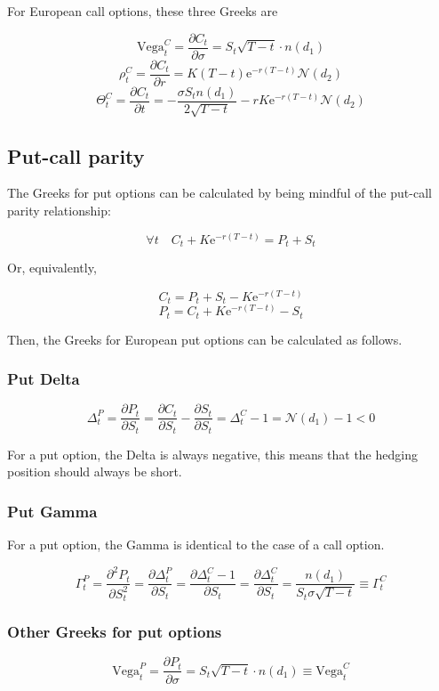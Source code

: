 \documentclass[oneside,titlepage,headinclude,12pt,a4paper,BCOR5mm,footinclude]{book}
\theoremstyle{defn}
\newcommand{\eexp}{\mathrm{e}}
\newcommand\NN{\mathcal{N}}
\newcommand\de\partial
\begin{document}
For European call options, these three Greeks are

\[
  \text{Vega}^C_t = \frac{\de C_t}{\de\sigma} = S_t\sqrt{T-t} \cdot n(d_1)
\]
\[
  \rho^C_t = \frac{\de C_t}{\de r} = K(T-t)\eexp^{-r(T-t)}\NN(d_2)
\]
\[
  \Theta^C_t = \frac{\de C_t}{\de t} = -\frac{\sigma S_t n(d_1)}{2\sqrt{T-t}} - rK\eexp^{-r(T-t)}\NN(d_2)
\]

\subsection{Put-call parity}

The Greeks for  put options can be  calculated by being mindful  of the put-call
parity relationship:

\[
  \forall t \quad C_t + K\eexp^{-r(T-t)} = P_t + S_t
\]

Or, equivalently,

\[
  C_t = P_t + S_t - K\eexp^{-r(T-t)}
\]
\[
  P_t = C_t + K\eexp^{-r(T-t)} - S_t
\]

Then, the Greeks for European put options can be calculated as follows.

\subsubsection{Put Delta}

\[
  \Delta^P_t = \frac{\de P_t}{\de S_t} = \frac{\de C_t}{\de S_t} - \frac{\de S_t}{\de S_t} =
    \Delta^C_t - 1 = \NN(d_1) - 1 < 0
\]

For a  put option,  the Delta is  always negative, this  means that  the hedging
position should always be short.

\subsubsection{Put Gamma}

For a put option, the Gamma is identical to the case of a call option.

\[
  \Gamma^P_t = \frac{\de^2 P_t}{\de S_t^2} = \frac{\de \Delta^P_t}{\de S_t} =
  \frac{\de \Delta^C_t - 1}{\de S_t} = \frac{\de \Delta^C_t}{\de S_t} = \frac{n(d_1)}{S_t\sigma\sqrt{T-t}} \equiv \Gamma^C_t
\]

\subsubsection{Other Greeks for put options}

\[
  \text{Vega}^P_t = \frac{\de P_t}{\de \sigma} = S_t\sqrt{T-t}\cdot n(d_1) \equiv \text{Vega}^C_t
\]
\end{document}
